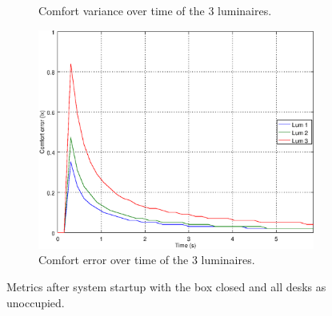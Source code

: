 \begin{figure}[ht]
\begin{subfigure}[t]{0.32\textwidth}
    \caption{Comfort variance over time of the 3 luminaires.}
    \label{fig:f_closed_o000}
    \end{subfigure}
    \begin{subfigure}[t]{0.32\textwidth}
    \centering
    \includegraphics[width=.95\textwidth]{img/n_closed_o000}
    \caption{Comfort error over time of the 3 luminaires.}
    \label{fig:n_closed_o000}
    \end{subfigure}
    \caption{Metrics after system startup with the box closed and all desks as unoccupied. }
\end{figure}


